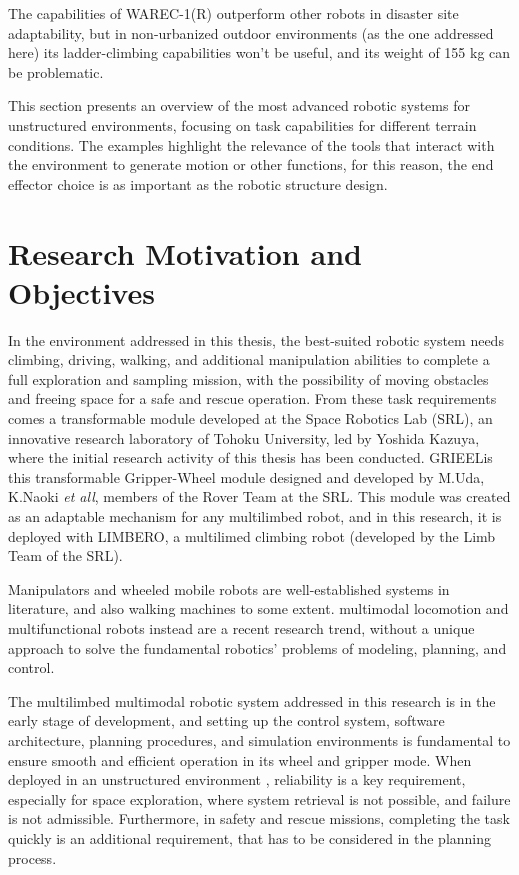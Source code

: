 The capabilities of WAREC-1(R) outperform other robots in disaster site adaptability, but in non-urbanized outdoor environments   (as the one addressed here) its ladder-climbing capabilities won't be useful, and its weight of 155 kg\cite{WAREC1} can be problematic.  

This section presents an overview of the most advanced robotic systems for unstructured environments, focusing on task capabilities for different terrain conditions. The examples highlight the relevance of the tools that interact with the environment to generate motion or other functions, for this reason, the end effector choice is as important as the robotic structure design. 



\section{Research Motivation and Objectives}
\label{sec:objectives}

In the environment addressed in this thesis, the best-suited robotic system needs climbing, driving, walking, and additional manipulation abilities to complete a full exploration and sampling mission, with the possibility of moving obstacles and freeing space for a safe and rescue operation. 
From these task requirements comes a transformable module developed at the Space Robotics Lab (SRL)\cite{SRL}, an innovative research laboratory of Tohoku University, led by Yoshida Kazuya, where the initial research activity of this thesis has been conducted.
GRIEEL\cite{GRIEELUdaThesis}\cite{GrieelUda}is this transformable Gripper-Wheel module designed and developed by M.Uda, K.Naoki \textit{et all}, members of the Rover Team at the SRL.
This module was created as an adaptable mechanism for any multilimbed robot, and in this research, it is deployed with LIMBERO, a multilimed climbing robot (developed by the Limb Team of the SRL). 

Manipulators and wheeled mobile robots are well-established systems in literature, and also walking machines to some extent. multimodal locomotion and multifunctional robots instead are a recent research trend, without a unique approach to solve the fundamental robotics' problems of modeling, planning, and control\cite{Siciliano}.

The multilimbed multimodal robotic system addressed in this research is in the early stage of development, and setting up the control system, software architecture, planning procedures, and simulation environments is fundamental to ensure smooth and efficient operation in its wheel and gripper mode. When deployed in an unstructured environment \cite{UnstructuredHOW}, reliability is a key requirement, especially for space exploration, where system retrieval is not possible, and failure is not admissible. Furthermore, in safety and rescue missions, completing the task quickly is an additional requirement, that has to be considered in the planning process.

